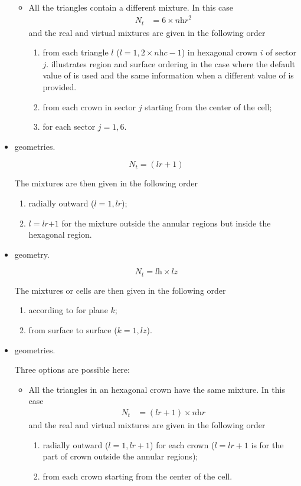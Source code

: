 \begin{itemize}
\begin{itemize}
\item All the triangles contain a different mixture. In this case
\begin{align*}N_{t}&=6\times \textit{nhr}^{2}\end{align*}
and the real and virtual mixtures are given in the following order 
\begin{enumerate}
\item from each triangle $l$ ($l=1,2\times \textit{nhc}-1$) in hexagonal crown $i$ of sector $j$.  illustrates region and surface ordering in the case where the default value of  is used and  the same information when a different value of  is provided.
\item from each crown in sector $j$ starting from the center of the cell;
\item for each sector $j=1,6$.
\end{enumerate}
\end{itemize}

\item {} geometries.

$$N_{t}=(\textit{lr}+1)$$

The mixtures are then given in the following order
\begin{enumerate}
\item radially outward ($l=1,\textit{lr}$);
\item $l=\textit{lr+1}$ for the mixture outside the annular regions but inside the hexagonal region.
\end{enumerate}

\item {} geometry.

$$N_{t}=\textit{lh}\times \textit{lz}$$

The mixtures or cells are then given in the following order

\begin{enumerate}
\item according to  for plane $k$;
\item from surface  to surface  ($k=1,\textit{lz}$).
\end{enumerate}

\item {} geometries.

Three options are possible here:
\begin{itemize}
\item All the triangles in an hexagonal crown have the same mixture. In this case
\begin{align*}N_{t}&=(\textit{lr}+1)\times \textit{nhr}\end{align*}
and the real and virtual mixtures are given in the following order
\begin{enumerate}
\item radially outward ($l=1,\textit{lr}+1$) for each crown ($l=\textit{lr}+1$ is for the part of crown outside the annular regions);
\item from each crown starting from the center of the cell.
\end{enumerate}


\end{itemize}
\end{itemize}
